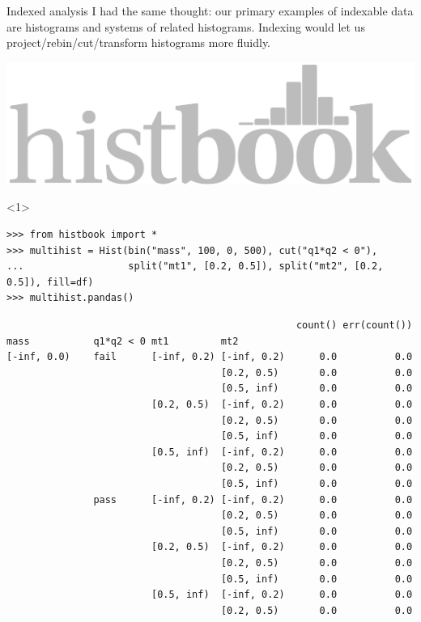 \documentclass[aspectratio=169]{beamer}
\begin{document}
\begin{frame}[fragile]{Indexed analysis}
\large
\vspace{0.25 cm}
I had the same thought: our primary examples of indexable data are histograms and systems of related histograms. Indexing would let us project/rebin/cut/transform histograms more fluidly.

\vspace{-0.5 cm}
\hfill \includegraphics[height=1 cm]{histbook-logo.pdf}

\vspace{-0.5 cm}
\vspace{0.25 cm}
\begin{onlyenv}<1>
\scriptsize
\begin{verbatim}
>>> from histbook import *
>>> multihist = Hist(bin("mass", 100, 0, 500), cut("q1*q2 < 0"),
...                  split("mt1", [0.2, 0.5]), split("mt2", [0.2, 0.5]), fill=df)
>>> multihist.pandas()
\end{verbatim}
\tiny
\vspace{-0.25 cm}
\begin{verbatim}
                                                  count() err(count())
mass           q1*q2 < 0 mt1         mt2
[-inf, 0.0)    fail      [-inf, 0.2) [-inf, 0.2)      0.0          0.0
                                     [0.2, 0.5)       0.0          0.0
                                     [0.5, inf)       0.0          0.0
                         [0.2, 0.5)  [-inf, 0.2)      0.0          0.0
                                     [0.2, 0.5)       0.0          0.0
                                     [0.5, inf)       0.0          0.0
                         [0.5, inf)  [-inf, 0.2)      0.0          0.0
                                     [0.2, 0.5)       0.0          0.0
                                     [0.5, inf)       0.0          0.0
               pass      [-inf, 0.2) [-inf, 0.2)      0.0          0.0
                                     [0.2, 0.5)       0.0          0.0
                                     [0.5, inf)       0.0          0.0
                         [0.2, 0.5)  [-inf, 0.2)      0.0          0.0
                                     [0.2, 0.5)       0.0          0.0
                                     [0.5, inf)       0.0          0.0
                         [0.5, inf)  [-inf, 0.2)      0.0          0.0
                                     [0.2, 0.5)       0.0          0.0

\end{verbatim}
\end{onlyenv}
\end{frame}
\end{document}
